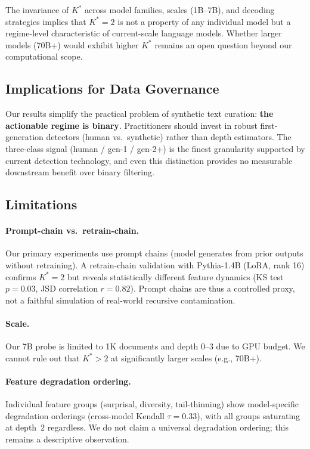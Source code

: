 \documentclass[11pt,a4paper]{article}
\begin{document}
The invariance of $K^*$ across model families, scales (1B--7B), and decoding strategies implies that $K^*=2$ is not a property of any individual model but a regime-level characteristic of current-scale language models.
Whether larger models (70B+) would exhibit higher $K^*$ remains an open question beyond our computational scope.

\subsection{Implications for Data Governance}

Our results simplify the practical problem of synthetic text curation: \textbf{the actionable regime is binary}.
Practitioners should invest in robust first-generation detectors (human vs.\ synthetic) rather than depth estimators.
The three-class signal (human / gen-1 / gen-2+) is the finest granularity supported by current detection technology, and even this distinction provides no measurable downstream benefit over binary filtering.

\subsection{Limitations}

\paragraph{Prompt-chain vs.\ retrain-chain.}
Our primary experiments use prompt chains (model generates from prior outputs without retraining).
A retrain-chain validation with Pythia-1.4B (LoRA, rank 16) confirms $K^*=2$ but reveals statistically different feature dynamics (KS test $p=0.03$, JSD correlation $r=0.82$).
Prompt chains are thus a controlled proxy, not a faithful simulation of real-world recursive contamination.

\paragraph{Scale.}
Our 7B probe is limited to 1K documents and depth 0--3 due to GPU budget.
We cannot rule out that $K^*>2$ at significantly larger scales (e.g., 70B+).

\paragraph{Feature degradation ordering.}
Individual feature groups (surprisal, diversity, tail-thinning) show model-specific degradation orderings (cross-model Kendall $\tau = 0.33$), with all groups saturating at depth~2 regardless.
We do not claim a universal degradation ordering; this remains a descriptive observation.
\end{document}
